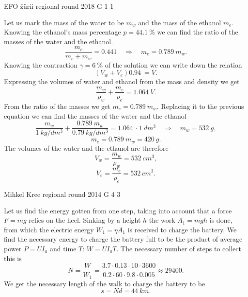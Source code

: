 \documentclass[11pt]{article}
\begin{document}
{EFO žürii} %
{regional round} %
{2018} %
{G 1} %
{1} %
{

\ifEngSolution
Let us mark the mass of the water to be $m_w$ and the mass of the ethanol $m_e$. Knowing the ethanol’s mass percentage $p = \SI{44,1}{\percent}$ we can find the ratio of the masses of the water and the ethanol. 
\[ \frac{m_e}{m_e+m_w}=\SI{0,441}  \quad\Rightarrow\quad m_e=\SI{0,789}{}m_w.\]
Knowing the contraction $\gamma = \SI{6}{\percent}$ of the solution we can write down the relation
\[ (V_w + V_e)\SI{0,94}{} = V.\]
Expressing the volumes of water and ethanol from the mass and density we get
\[ \frac{m_w}{\rho_w} + \frac{m_e}{\rho_e} = \SI{1,064}{}V.\]
From the ratio of the masses we get $m_e=\SI{0,789}{}m_w$. Replacing it to the previous equation we can find the masses of the water and the ethanol
\[ \frac{m_w}{\SI{1}{kg/dm^3}} + \frac{\SI{0,789}{}{m_w}}{\SI{0,79}{kg/dm^3}} = \SI{1,064}{}\cdot\SI{1}{dm^3} \quad\Rightarrow\quad
m_w = \SI{532}{g},\]
\[ m_e = \SI{0,789}{}m_w =  \SI{420}{g}.\]
The volumes of the water and the ethanol are therefore
\[ V_w = \frac{m_w}{\rho_w} = \SI{532}{cm^3},\]
\[ V_e = \frac{m_e}{\rho_e} =  \SI{532}{cm^3}.\]
\fi
}

{Mihkel Kree} %
{regional round} %
{2014} %
{G 4} %
{3} %
{

\ifEngSolution
Let us find the energy gotten from one step, taking into account that a force $F=mg$ relies on the heel. Sinking by a height $h$ the work $A_1 = mgh$ is done, from which the electric energy $W_1=\eta A_1$ is received to charge the battery. We find the necessary energy to charge the battery full to be the product of average power $P=UI_a$ and time $T$: $W=UI_aT$. The necessary number of steps to collect this is 
\[N = \frac{W}{W_1} = \frac{3.7 \cdot 0.13 \cdot 10 \cdot 3600 }{0.2 \cdot 60\cdot 9.8 \cdot 0.005}\approx29400.\]
We get the necessary length of the walk to charge the battery to be
\[s=Nd = \SI{44}{km}.\]
\fi
}
\end{document}
